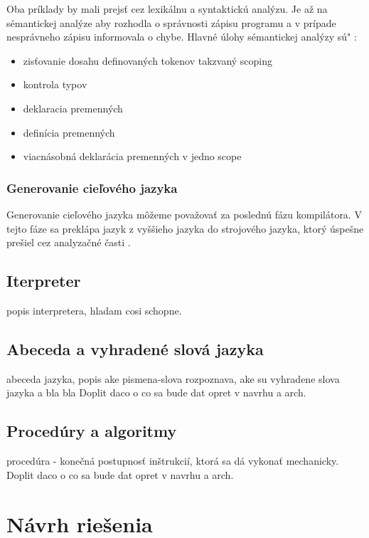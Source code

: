 Oba príklady by mali prejsť cez lexikálnu a syntaktickú analýzu. Je až na sémantickej analýze aby rozhodla o správnosti zápisu programu a v prípade nesprávneho zápisu informovala o chybe.  Hlavné úlohy sémantickej analýzy sú" :

\begin{itemize}
	\item zisťovanie dosahu definovaných tokenov takzvaný scoping
	\item kontrola typov
	\item deklaracia premenných
	\item definícia premenných
	\item viacnásobná deklarácia premenných v jedno scope
\end{itemize}

\subsubsection{Generovanie cieľového jazyka}
\indent Generovanie cieľového jazyka môžeme považovať za poslednú fázu kompilátora. V tejto fáze sa preklápa jazyk z vyššieho jazyka do strojového jazyka, ktorý úspešne prešiel cez analyzačné časti .

\subsection{Iterpreter}
\indent popis interpretera, hladam cosi schopne.

\subsection{Abeceda a vyhradené slová jazyka}
abeceda jazyka, popis ake pismena-slova rozpoznava, ake su vyhradene slova jazyka a bla bla
Doplit daco o co sa bude dat opret v navrhu a arch.

\subsection{Procedúry a algoritmy}
procedúra - konečná postupnosť inštrukcií, ktorá sa dá vykonať mechanicky. Doplit daco o co sa bude dat opret v navrhu a arch.

\section{Návrh riešenia}
